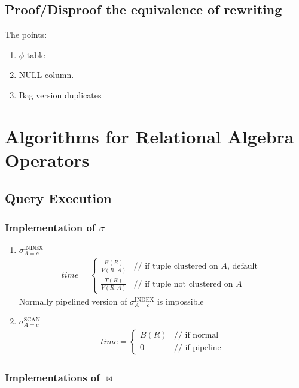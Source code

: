 \documentclass[a4paper]{report}
\begin{document}
\subsection{Proof/Disproof the equivalence of rewriting}
The  points:
\begin{enumerate}
\item $\phi$ table
\item NULL column.
\item Bag version duplicates
\end{enumerate}



\section{Algorithms for Relational Algebra Operators}
\subsection{Query Execution}\label{sec:queryExec}
\subsubsection{Implementation of $\sigma$}
\begin{enumerate}
\item $\sigma^\text{INDEX}_{A=c}$
\begin{eqnarray*}
time = \left\{ \begin{array}{rl}
  \frac{B(R)}{V(R, A)} &\text{// if tuple clustered on $A$, default }\\
  \frac{T(R)}{V(R, A)} &\text{// if tuple not clustered on $A$}
       \end{array} \right.
\end{eqnarray*}
Normally pipelined version of $\sigma^\text{INDEX}_{A=c}$ is impossible
\item $\sigma^\text{SCAN}_{A=c}$
\begin{eqnarray*}
time = \left\{ \begin{array}{rl}
  B(R) &\text{// if normal }\\
  0 &\text{// if pipeline}
       \end{array} \right.
\end{eqnarray*}
\end{enumerate}
\subsubsection{Implementations of $\bowtie$}
\end{document}
